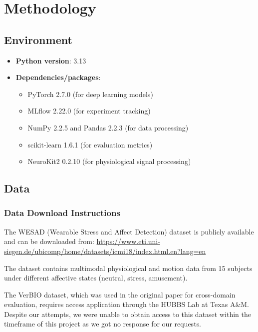 \documentclass[10pt,letterpaper,twocolumn]{article}
\begin{document}
\section{Methodology}

\subsection{Environment}

\begin{itemize}
    \item \textbf{Python version}: 3.13
    \item \textbf{Dependencies/packages}:
    \begin{itemize}
        \item PyTorch 2.7.0 (for deep learning models)
        \item MLflow 2.22.0 (for experiment tracking)
        \item NumPy 2.2.5 and Pandas 2.2.3 (for data processing)
        \item scikit-learn 1.6.1 (for evaluation metrics)
        \item NeuroKit2 0.2.10 (for physiological signal processing)
    \end{itemize}
\end{itemize}

\subsection{Data}

\subsubsection{Data Download Instructions}

The WESAD (Wearable Stress and Affect Detection) dataset is publicly available and can be downloaded from:
\url{https://www.eti.uni-siegen.de/ubicomp/home/datasets/icmi18/index.html.en?lang=en}

The dataset contains multimodal physiological and motion data from 15 subjects under different affective states (neutral, stress, amusement).

The VerBIO dataset, which was used in the original paper for cross-domain evaluation, requires access application through the HUBBS Lab at Texas A\&M. Despite our attempts, we were unable to obtain access to this dataset within the timeframe of this project as we got no response for our requests.
\end{document}
